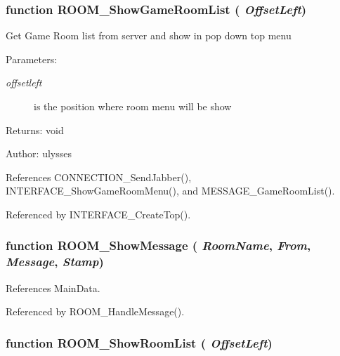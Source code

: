 \subsubsection{\setlength{\rightskip}{0pt plus 5cm}function ROOM\_\-ShowGameRoomList ( {\em OffsetLeft})}\label{room_2room_8js_91d21a152f5e1de5e0414816d46e9a44}


Get Game Room list from server and show in pop down top menu

\begin{Desc}
\item[Parameters:]
\begin{description}
\item[{\em offsetleft}]is the position where room menu will be show \end{description}
\end{Desc}
\begin{Desc}
\item[Returns:]void \end{Desc}
\begin{Desc}
\item[Author:]ulysses \end{Desc}


References CONNECTION\_\-SendJabber(), INTERFACE\_\-ShowGameRoomMenu(), and MESSAGE\_\-GameRoomList().

Referenced by INTERFACE\_\-CreateTop().
\subsubsection{\setlength{\rightskip}{0pt plus 5cm}function ROOM\_\-ShowMessage ( {\em RoomName}, \/   {\em From}, \/   {\em Message}, \/   {\em Stamp})}\label{room_2room_8js_2f5da06839d0aeb9fc8f30ceb1009dfb}




References MainData.

Referenced by ROOM\_\-HandleMessage().
\subsubsection{\setlength{\rightskip}{0pt plus 5cm}function ROOM\_\-ShowRoomList ( {\em OffsetLeft})}\label{room_2room_8js_99678e0a267a2fa6853fe401b4b8be73}


